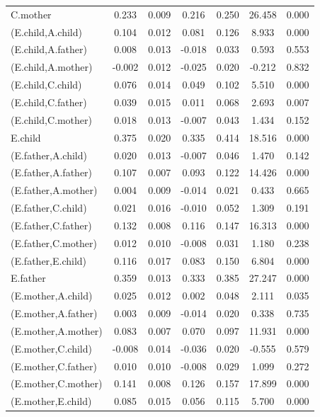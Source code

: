 \documentclass[11pt,a5paper,twoside]{book}
\begin{document}
{{\begin{center}
\begin{longtable}{@{\extracolsep{\fill}}lcccccc@{}}
   C.mother  & 0.233 & 0.009 & 0.216 & 0.250 & 26.458 & 0.000 \\ 
   (E.child,A.child)  & 0.104 & 0.012 & 0.081 & 0.126 & 8.933 & 0.000 \\ 
   (E.child,A.father)  & 0.008 & 0.013 & -0.018 & 0.033 & 0.593 & 0.553 \\ 
   (E.child,A.mother)  & -0.002 & 0.012 & -0.025 & 0.020 & -0.212 & 0.832 \\ 
   (E.child,C.child)  & 0.076 & 0.014 & 0.049 & 0.102 & 5.510 & 0.000 \\ 
   (E.child,C.father)  & 0.039 & 0.015 & 0.011 & 0.068 & 2.693 & 0.007 \\ 
   (E.child,C.mother)  & 0.018 & 0.013 & -0.007 & 0.043 & 1.434 & 0.152 \\ 
   E.child  & 0.375 & 0.020 & 0.335 & 0.414 & 18.516 & 0.000 \\ 
   (E.father,A.child)  & 0.020 & 0.013 & -0.007 & 0.046 & 1.470 & 0.142 \\ 
   (E.father,A.father)  & 0.107 & 0.007 & 0.093 & 0.122 & 14.426 & 0.000 \\ 
   (E.father,A.mother)  & 0.004 & 0.009 & -0.014 & 0.021 & 0.433 & 0.665 \\ 
   (E.father,C.child)  & 0.021 & 0.016 & -0.010 & 0.052 & 1.309 & 0.191 \\ 
   (E.father,C.father)  & 0.132 & 0.008 & 0.116 & 0.147 & 16.313 & 0.000 \\ 
   (E.father,C.mother)  & 0.012 & 0.010 & -0.008 & 0.031 & 1.180 & 0.238 \\ 
   (E.father,E.child)  & 0.116 & 0.017 & 0.083 & 0.150 & 6.804 & 0.000 \\ 
   E.father  & 0.359 & 0.013 & 0.333 & 0.385 & 27.247 & 0.000 \\ 
   (E.mother,A.child)  & 0.025 & 0.012 & 0.002 & 0.048 & 2.111 & 0.035 \\ 
   (E.mother,A.father)  & 0.003 & 0.009 & -0.014 & 0.020 & 0.338 & 0.735 \\ 
   (E.mother,A.mother)  & 0.083 & 0.007 & 0.070 & 0.097 & 11.931 & 0.000 \\ 
   (E.mother,C.child)  & -0.008 & 0.014 & -0.036 & 0.020 & -0.555 & 0.579 \\ 
   (E.mother,C.father)  & 0.010 & 0.010 & -0.008 & 0.029 & 1.099 & 0.272 \\ 
   (E.mother,C.mother)  & 0.141 & 0.008 & 0.126 & 0.157 & 17.899 & 0.000 \\ 
   (E.mother,E.child)  & 0.085 & 0.015 & 0.056 & 0.115 & 5.700 & 0.000 \\ 

\end{longtable}
\end{center}}}
\end{document}
